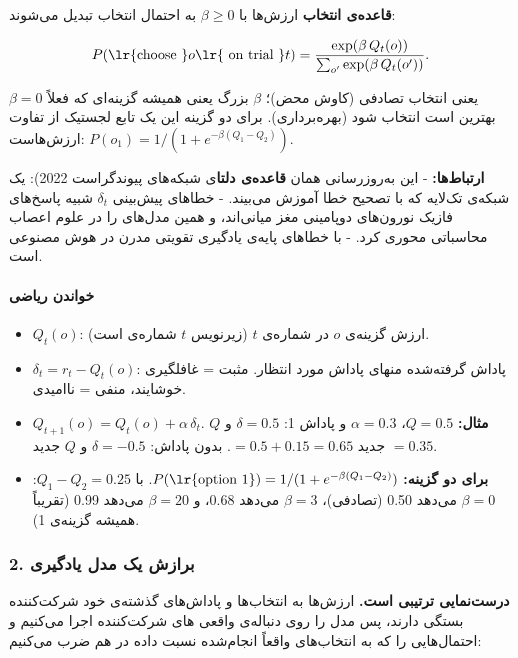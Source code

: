 \textbf{قاعده‌ی انتخاب } ارزش‌ها با \textbf{} \(\beta \ge 0\) به احتمال انتخاب تبدیل می‌شوند:

\[
P(\text{\lr{choose }} o \text{\lr{ on trial }} t) = \frac{\exp(\beta\, Q_t(o))}{\sum_{o'} \exp(\beta\, Q_t(o'))}.
\]

\(\beta = 0\) یعنی انتخاب تصادفی (کاوش محض)؛ \(\beta\) بزرگ یعنی همیشه
گزینه‌ای که فعلاً بهترین است انتخاب شود (بهره‌برداری). برای دو گزینه این یک
تابع لجستیک از تفاوت ارزش‌هاست:
\(P(o_1) = 1/(1 + e^{-\beta(Q_1 - Q_2)})\).

\textbf{ارتباط‌ها:} - این به‌روزرسانی همان \textbf{قاعده‌ی دلتا}ی شبکه‌های
پیوندگراست  2022): یک شبکه‌ی تک‌لایه که با تصحیح خطا آموزش
می‌بیند. - خطاهای پیش‌بینی \(\delta_t\) شبیه پاسخ‌های فازیک نورون‌های
دوپامینی مغز میانی‌اند، و همین مدل‌های  را در علوم اعصاب محاسباتی
محوری کرد. -  با خطاهای  پایه‌ی
یادگیری تقویتی مدرن در هوش مصنوعی است.

\paragraph{خواندن ریاضی}

\begin{itemize}
\tightlist
\item
  \(Q_t(o)\): ارزش گزینه‌ی \(o\) در  شماره‌ی \(t\) (زیرنویس
  \(t\) شماره‌ی  است).
\item
  \(\delta_t = r_t - Q_t(o)\): پاداش گرفته‌شده منهای پاداش مورد انتظار.
  مثبت = غافلگیری خوشایند، منفی = ناامیدی.
\item
  \(Q_{t+1}(o) = Q_t(o) + \alpha\,\delta_t\). \textbf{مثال:}
  \(Q = 0.5\)، \(\alpha = 0.3\) و پاداش 1: \(\delta = 0.5\) و \(Q\) جدید
  \(= 0.5 + 0.15 = 0.65\). بدون پاداش: \(\delta = -0.5\) و \(Q\) جدید
  \(= 0.35\).
\item
  \textbf{ برای دو گزینه:}
  \(P(\text{\lr{option 1}}) = 1/(1 + e^{-\beta(Q_1 - Q_2)})\). با
  \(Q_1 - Q_2 = 0.25\): \(\beta = 0\) می‌دهد 0.50 (تصادفی)، \(\beta = 3\)
  می‌دهد 0.68، و \(\beta = 20\) می‌دهد 0.99 (تقریباً همیشه گزینه‌ی 1).
\end{itemize}

\subsubsection{2. برازش یک مدل یادگیری}

\textbf{درست‌نمایی ترتیبی است.} ارزش‌ها به انتخاب‌ها و پاداش‌های گذشته‌ی خود
شرکت‌کننده بستگی دارند، پس مدل را روی دنباله‌ی واقعی های
شرکت‌کننده اجرا می‌کنیم و احتمال‌هایی را که به انتخاب‌های واقعاً انجام‌شده
نسبت داده در هم ضرب می‌کنیم:

